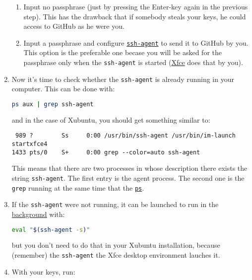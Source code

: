 \begin{enumerate}
  \begin{enumerate}
  \item Input no passphrase (just by pressing the Enter-key again in
    the previous step). This has the drawback that if somebody steals
    your keys, he could access to GitHub as he were you.
  \item Input a passphrase and configure
    \href{https://www.ssh.com/ssh/agent}{\texttt{ssh-agent}} to send
    it to GitHub by you. This option is the preferable one becase you
    will be asked for the passphrase only when the \texttt{ssh-agent}
    is started (\href{https://www.xfce.org/}{Xfce} does that by you).
  \end{enumerate}

\item Now it's time to check whether the \texttt{ssh-agent} is already
  running in your computer. This can be done with:

  \begin{lstlisting}[language=bash]
    ps aux | grep ssh-agent
  \end{lstlisting}

  and in the case of Xubuntu, you should get something similar to:

\begin{verbatim}
 989 ?        Ss     0:00 /usr/bin/ssh-agent /usr/bin/im-launch startxfce4
1433 pts/0    S+     0:00 grep --color=auto ssh-agent
\end{verbatim}

  This means that there are two processes in whose description there
  exists the string \texttt{ssh-agent}. The first entry is the agent
  process. The second one is the \texttt{grep} running at the same
  time that the
  \href{https://man7.org/linux/man-pages/man1/ps.1.html}{\texttt{ps}}.

\item If the \texttt{ssh-agent} were not running, it can be launched
  to run in
  the \href{https://en.wikipedia.org/wiki/Background_process}{background}
  with:

  \begin{lstlisting}[language=bash]
    eval "$(ssh-agent -s)"
  \end{lstlisting}

  but you don't need to do that in your Xubuntu installation, because
  (remember) the \texttt{ssh-agent} the
  Xfce desktop environment lauches it.

\item With your keys, run:


\end{enumerate}
